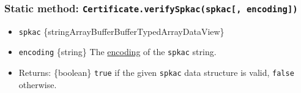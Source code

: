 \begin{Shaded}
\begin{Highlighting}[]
\OperatorTok{=} \NormalTok{(}\NormalTok{)}\OperatorTok{;}
\OperatorTok{=} \NormalTok{()}\OperatorTok{;}
\OperatorTok{=}\OperatorTok{;}
\OperatorTok{;}
\end{Highlighting}
\end{Shaded}

\subsubsection{\texorpdfstring{Static method:
\texttt{Certificate.verifySpkac(spkac{[},\ encoding{]})}}{Static method: Certificate.verifySpkac(spkac{[}, encoding{]})}}\label{static-method-certificate.verifyspkacspkac-encoding}

\begin{itemize}
\tightlist
\item
  \texttt{spkac}
  \{string\textbar ArrayBuffer\textbar Buffer\textbar TypedArray\textbar DataView\}
\item
  \texttt{encoding} \{string\} The
  \href{buffer.md\#buffers-and-character-encodings}{encoding} of the
  \texttt{spkac} string.
\item
  Returns: \{boolean\} \texttt{true} if the given \texttt{spkac} data
  structure is valid, \texttt{false} otherwise.
\end{itemize}

\begin{Shaded}
\begin{Highlighting}[]
\NormalTok{ \{ }\NormalTok{ \} } \OperatorTok{;}
\OperatorTok{=}  \NormalTok{(}\NormalTok{)}\OperatorTok{;}

\OperatorTok{=} \NormalTok{()}\OperatorTok{;}
\NormalTok{(}\OperatorTok{;}
\end{Highlighting}
\end{Shaded}

